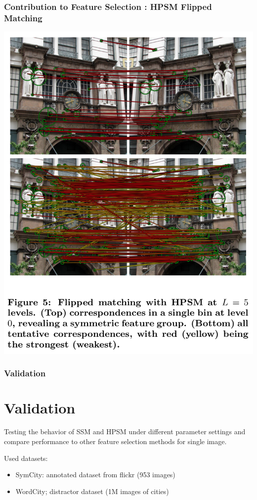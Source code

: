 \documentclass[11pt]{beamer}
\begin{document}
\begin{frame}
\frametitle{Contribution to Feature Selection : HPSM Flipped Matching}
\begin{center}
\includegraphics[scale=0.3]{figure5}
\end{center}
\end{frame}



\begin{frame}
\frametitle{Validation}
\section{Validation}
Testing the behavior of SSM and HPSM under different parameter settings and compare performance to other feature selection methods for single image.

\vspace{0.3cm}
Used datasets:
\begin{itemize}
\item SymCity: annotated dataset from flickr (953 images)
\item WordCity; distractor dataset (1M images of cities)
\end{itemize}

\end{frame}
\end{document}
